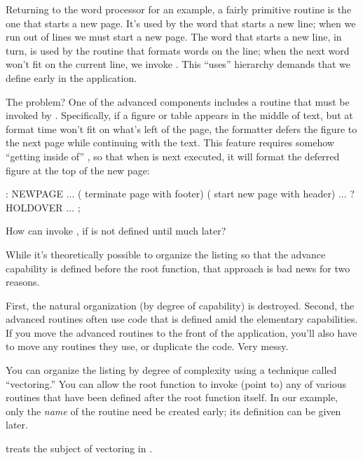 Returning to the word processor for an example, a fairly primitive
routine is the one that starts a new page. It's used by the word that
starts a new line; when we run out of lines we must start a new
page. The word that starts a new line, in turn, is used by the routine
that formats words on the line; when the next word won't fit on the
current line, we invoke . This ``uses'' hierarchy demands that
we define  early in the application.

The problem? One of the advanced components includes a routine that
must be invoked by . Specifically, if a figure or table
appears in the middle of text, but at format time won't fit on what's
left of the page, the formatter defers the figure to the next page
while continuing with the text. This feature requires somehow
``getting inside of'' , so that when  is
next executed, it will format the deferred figure at the top of the
new page:

\begin{Code}
: NEWPAGE  ... ( terminate page with footer)
   ( start new page with header)  ...  ?HOLDOVER ... ;
\end{Code}
How can  invoke , if  is not
defined until much later?

While it's theoretically possible to organize the listing so that the
advance capability is defined before the root function, that approach is
bad news for two reasons.

First, the natural organization (by degree of capability) is
destroyed. Second, the advanced routines often use code that is defined
amid the elementary capabilities. If you move the advanced routines to
the front of the application, you'll also have to move any routines they
use, or duplicate the code. Very messy.

You can organize the listing by degree of complexity using a technique
called ``vectoring.'' You can allow the root function to invoke (point
to) any of various routines that have been defined after the root
function itself. In our example, only the \emph{name} of the routine
 need be created early; its definition can be given later.%

 treats the subject of vectoring in \Forth{}.%
%
%

